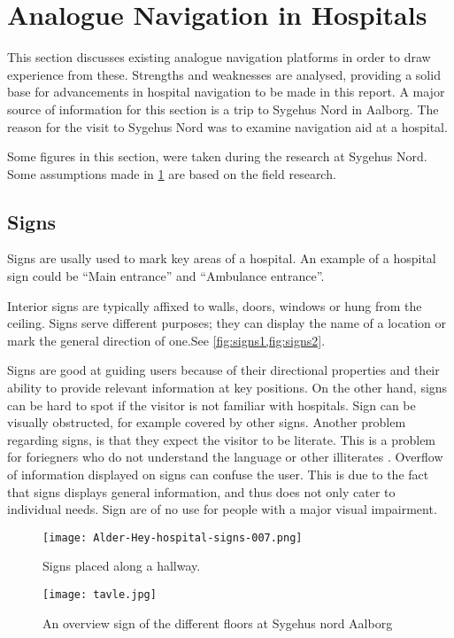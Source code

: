 \section{Analogue Navigation in Hospitals} %
\label{sec:anal_nav}

This section discusses existing analogue navigation platforms in order to draw experience from these. Strengths and weaknesses are analysed, providing a solid base for advancements in hospital navigation to be made in this report. A major source of information for this section is a trip to Sygehus Nord in Aalborg. The reason for the visit to Sygehus Nord was to examine navigation aid at a hospital.

Some figures in this section, were taken during the research at Sygehus Nord. Some assumptions made in \cref{sec:anal_nav} are based on the field research.

\subsection{Signs} \label{sub:sign}
Signs are usally used to mark key areas of a hospital. An example of a hospital sign could be \enquote{Main entrance} and \enquote{Ambulance entrance}\cite{signs_hospital,art_Osborne}.

Interior signs are typically affixed to walls, doors, windows or hung from the ceiling. Signs serve different purposes; they can display the name of a location or mark the general direction of one.See \cref{fig:signs1,fig:signs2}.

Signs are good at guiding users because of their directional properties and their ability to provide relevant information at key positions. On the other hand, signs can be hard to spot if the visitor is not familiar with hospitals. Sign can be visually obstructed, for example covered by other signs. Another problem regarding signs, is that they expect the visitor to be literate. This is a problem for foriegners who do not understand the language or other illiterates \cite{signs_reading}. Overflow of information displayed on signs can confuse the user. This is due to the fact that signs displays general information, and thus does not only cater to individual needs. Sign are of no use for people with a major visual impairment.


\begin{figure}
\centering
  \begin{minipage}{0.45\textwidth}
    \centering
    \texttt{[image: Alder-Hey-hospital-signs-007.png]}
    \caption{Signs placed along a hallway. \cite{signs_hospital}} \label{fig:signs1}
  \end{minipage}
  \hfill
  \begin{minipage}{0.45\textwidth}
    \centering
    \texttt{[image: tavle.jpg]}
    \caption{An overview sign of the different floors at Sygehus nord Aalborg} \label{fig:signs2}
  \end{minipage}
  \end{figure}

